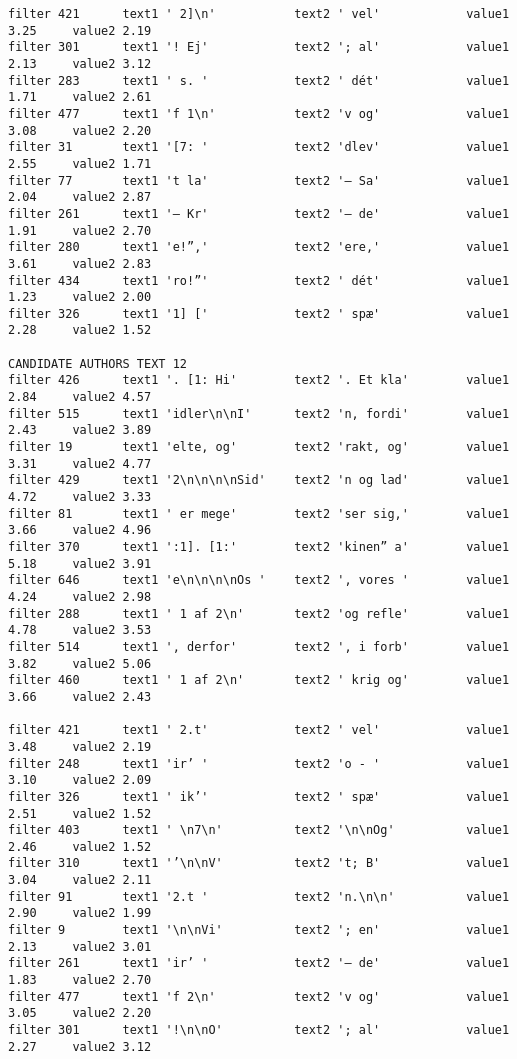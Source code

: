 {\begin{verbatim}
filter 421      text1 ' 2]\n'           text2 ' vel'            value1 3.25     value2 2.19
filter 301      text1 '! Ej'            text2 '; al'            value1 2.13     value2 3.12
filter 283      text1 ' s. '            text2 ' dét'            value1 1.71     value2 2.61
filter 477      text1 'f 1\n'           text2 'v og'            value1 3.08     value2 2.20
filter 31       text1 '[7: '            text2 'dlev'            value1 2.55     value2 1.71
filter 77       text1 't la'            text2 '– Sa'            value1 2.04     value2 2.87
filter 261      text1 '– Kr'            text2 '– de'            value1 1.91     value2 2.70
filter 280      text1 'e!”,'            text2 'ere,'            value1 3.61     value2 2.83
filter 434      text1 'ro!”'            text2 ' dét'            value1 1.23     value2 2.00
filter 326      text1 '1] ['            text2 ' spæ'            value1 2.28     value2 1.52

CANDIDATE AUTHORS TEXT 12
filter 426      text1 '. [1: Hi'        text2 '. Et kla'        value1 2.84     value2 4.57
filter 515      text1 'idler\n\nI'      text2 'n, fordi'        value1 2.43     value2 3.89
filter 19       text1 'elte, og'        text2 'rakt, og'        value1 3.31     value2 4.77
filter 429      text1 '2\n\n\n\nSid'    text2 'n og lad'        value1 4.72     value2 3.33
filter 81       text1 ' er mege'        text2 'ser sig,'        value1 3.66     value2 4.96
filter 370      text1 ':1]. [1:'        text2 'kinen” a'        value1 5.18     value2 3.91
filter 646      text1 'e\n\n\n\nOs '    text2 ', vores '        value1 4.24     value2 2.98
filter 288      text1 ' 1 af 2\n'       text2 'og refle'        value1 4.78     value2 3.53
filter 514      text1 ', derfor'        text2 ', i forb'        value1 3.82     value2 5.06
filter 460      text1 ' 1 af 2\n'       text2 ' krig og'        value1 3.66     value2 2.43

filter 421      text1 ' 2.t'            text2 ' vel'            value1 3.48     value2 2.19
filter 248      text1 'ir’ '            text2 'o - '            value1 3.10     value2 2.09
filter 326      text1 ' ik’'            text2 ' spæ'            value1 2.51     value2 1.52
filter 403      text1 ' \n7\n'          text2 '\n\nOg'          value1 2.46     value2 1.52
filter 310      text1 '’\n\nV'          text2 't; B'            value1 3.04     value2 2.11
filter 91       text1 '2.t '            text2 'n.\n\n'          value1 2.90     value2 1.99
filter 9        text1 '\n\nVi'          text2 '; en'            value1 2.13     value2 3.01
filter 261      text1 'ir’ '            text2 '– de'            value1 1.83     value2 2.70
filter 477      text1 'f 2\n'           text2 'v og'            value1 3.05     value2 2.20
filter 301      text1 '!\n\nO'          text2 '; al'            value1 2.27     value2 3.12


\end{verbatim}}
